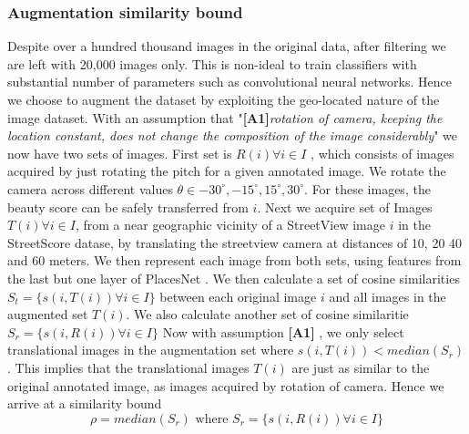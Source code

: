 \subsubsection{Augmentation similarity bound}
\label{sec:bound}
Despite over a hundred thousand images in the original data, after filtering we are left with 20,000 images only.
This is non-ideal to train classifiers with substantial number of parameters such as convolutional neural networks.
Hence we choose to augment the dataset by exploiting the geo-located nature of the image dataset. 
With an assumption that "\textbf{[A1]}\textit{rotation of camera, keeping the location constant, does not change the composition of the image considerably}" we now have two sets of images. 
First set  is $R(i) \forall i \in I$ , which consists of images acquired by just rotating the pitch for a given annotated image. We rotate the camera across different values $\theta \in {-30^{\circ}, -15^{\circ} , 15^{\circ} , 30^{\circ} }$. For these images, the beauty score can be safely transferred from $i$. 
Next we  acquire set of Images $T(i) \forall i \in I$, from a near geographic vicinity of a StreetView image $i$ in the StreetScore datase, by translating the streetview  camera at distances of 10, 20 40 and 60 meters. 
We then represent each image from both sets, using features from the last but one layer of PlacesNet \cite{zhou2014learning}. We then calculate a set of cosine similarities $ S_t = \{s(i,T(i)) \forall i \in I \}$
between each original image $i$ and all images in the augmented set $T(i)$. 
We also calculate another set of cosine similaritie  $ S_r = \{s(i,R(i)) \forall i \in I \}$
Now with assumption \textbf{[A1]} , we only select translational images in the augmentation set where $s(i,T(i)) < median(S_r)$. This implies that the translational images  $T(i) $ are just as similar to the original annotated image, as images acquired by rotation of camera. 
Hence we arrive at a similarity bound
\begin{equation}
	\rho = median(S_r) \text{ where }{S_r} = \{s(i,R(i)) \forall i \in I \}
	\label{eq:bound}
\end{equation}

